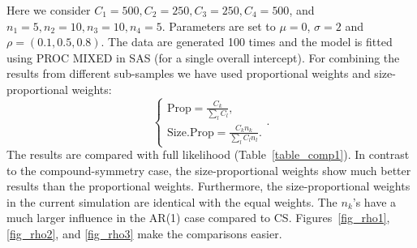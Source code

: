 \documentclass[11pt,a5paper,twoside]{book}
\begin{document}
{Here we consider $C_1=500,  C_2=250 ,C_3=250, C_4= 500$, and $n_1=5,n_2= 10,n_3= 10,n_4=  5$. Parameters are set to $\mu=0$, $\sigma=2$ and $\rho=(0.1,0.5,0.8)$. The data are generated 100 times and the model is fitted using PROC MIXED in SAS (for a single overall intercept). For combining the results from different sub-samples we have used proportional weights and size-proportional weights:
\begin{equation}
\label{weights}
\begin{cases}
\mbox{Prop}=\frac{C_k}{\sum_l C_l}, \\
\mbox{Size.Prop}=\frac{C_kn_k}{\sum_l C_l n_l}.
\end{cases}.
\end{equation}
The results are compared with full likelihood (Table~\ref{table_comp1}). In contrast to the compound-symmetry case, the size-proportional weights show much better results than the proportional weights. Furthermore, the size-proportional weights in the current simulation are identical with the equal weights. The $n_k$'s have a much larger influence in the AR(1) case compared to CS. 
 Figures~\ref{fig_rho1}, \ref{fig_rho2}, and \ref{fig_rho3} make the comparisons easier.
\begin{table}[t]
\centering
\caption{Comparing proportional, size-proportional and iterated optimal weights with full likelihood for AR(1) covariance structure.}
\label{table_comp1}
\end{table}

}
\end{document}
